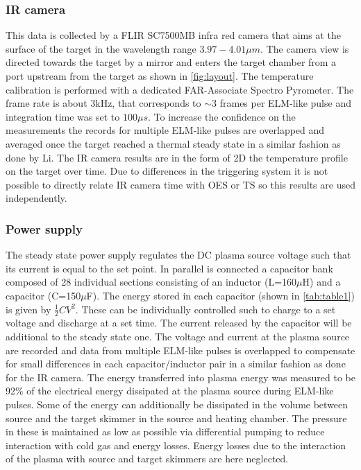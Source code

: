 \subsubsection{IR camera}\label{IR camera1}
This data is collected by a FLIR SC7500MB infra red camera that aims at the surface of the target in the wavelength range $3.97-4.01 \mu m$. The camera view is directed towards the target by a mirror and enters the target chamber from a port upstream from the target as shown in \autoref{fig:layout}. The temperature calibration is performed with a dedicated FAR-Associate Spectro Pyrometer. The frame rate is about 3kHz, that corresponds to $\sim$3 frames per ELM-like pulse and integration time was set to $100 \mu s$. To increase the confidence on the measurements the records for multiple ELM-like pulses are overlapped and averaged once the target reached a thermal steady state in a similar fashion as done by Li. \cite{Li2020} The IR camera results are in the form of 2D the temperature profile on the target over time. Due to differences in the triggering system it is not possible to directly relate IR camera time with OES or TS so this results are used independently.
\subsubsection{Power supply}\label{Power supply}
The steady state power supply regulates the DC plasma source voltage such that its current is equal to the set point. In parallel is connected a capacitor bank composed of 28 individual sections consisting of an inductor (L=160$\mu$H) and a capacitor (C=150$\mu$F). The energy stored in each capacitor (shown in \autoref{tab:table1}) is given by $\frac{1}{2}CV^2$. These can be individually controlled such to charge to a set voltage and discharge at a set time. The current released by the capacitor will be additional to the steady state one. The voltage and current at the plasma source are recorded and data from multiple ELM-like pulses is overlapped to compensate for small differences in each capacitor/inductor pair in a similar fashion as done for the IR camera. The energy transferred into plasma energy was measured to be 92\% of the electrical energy dissipated at the plasma source during ELM-like pulses.\cite{Morgan2014} Some of the energy can additionally be dissipated in the volume between source and the target skimmer in the source and heating chamber. The pressure in these is maintained as low as possible via differential pumping to reduce interaction with cold gas and energy losses. Energy losses due to the interaction of the plasma with source and target skimmers are here neglected.


